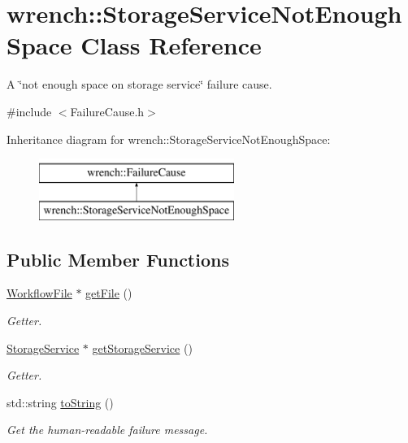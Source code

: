 \hypertarget{classwrench_1_1_storage_service_not_enough_space}{}\section{wrench\+:\+:Storage\+Service\+Not\+Enough\+Space Class Reference}
\label{classwrench_1_1_storage_service_not_enough_space}


A \char`\"{}not enough space on storage service\char`\"{} failure cause.  




{\ttfamily \#include $<$Failure\+Cause.\+h$>$}

Inheritance diagram for wrench\+:\+:Storage\+Service\+Not\+Enough\+Space\+:\begin{figure}[H]
\begin{center}
\leavevmode
\includegraphics[height=2.000000cm]{classwrench_1_1_storage_service_not_enough_space}
\end{center}
\end{figure}
\subsection*{Public Member Functions}
\begin{DoxyCompactItemize}
\item 
\hyperlink{classwrench_1_1_workflow_file}{Workflow\+File} $\ast$ \hyperlink{classwrench_1_1_storage_service_not_enough_space_a57d85bc5ed469118d3cb235270fffb3e}{get\+File} ()
\begin{DoxyCompactList}\small\item\em Getter. \end{DoxyCompactList}\item 
\hyperlink{classwrench_1_1_storage_service}{Storage\+Service} $\ast$ \hyperlink{classwrench_1_1_storage_service_not_enough_space_a1c480ac68fe40aadd348999d1069c5d0}{get\+Storage\+Service} ()
\begin{DoxyCompactList}\small\item\em Getter. \end{DoxyCompactList}\item 
std\+::string \hyperlink{classwrench_1_1_storage_service_not_enough_space_a42680e32c21db44888e173d6a0358326}{to\+String} ()
\begin{DoxyCompactList}\small\item\em Get the human-\/readable failure message. \end{DoxyCompactList}\end{DoxyCompactItemize}
